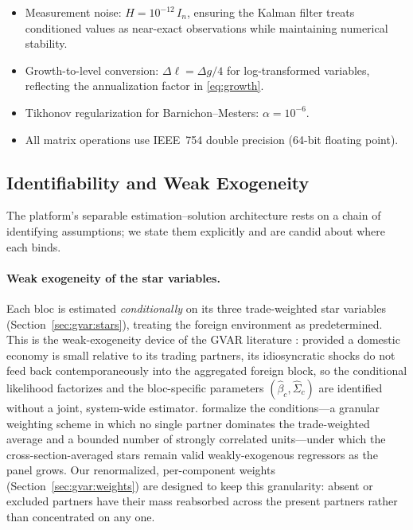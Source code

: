 \documentclass[11pt]{article}
\theoremstyle{definition}
\theoremstyle{remark}
\begin{document}
\begin{itemize}
  \item Measurement noise: $H = 10^{-12}\, I_n$, ensuring the Kalman
    filter treats conditioned values as near-exact observations while
    maintaining numerical stability.
  \item Growth-to-level conversion: $\Delta\ell = \Delta g / 4$ for
    log-transformed variables, reflecting the annualization factor in
    \eqref{eq:growth}.
  \item Tikhonov regularization for Barnichon--Mesters:
    $\alpha = 10^{-6}$.
  \item All matrix operations use IEEE~754 double precision
    (64-bit floating point).
\end{itemize}


\subsection{Identifiability and Weak Exogeneity}\label{sec:identif}

The platform's separable estimation--solution architecture rests on a chain of
identifying assumptions; we state them explicitly and are candid about where
each binds.

\paragraph{Weak exogeneity of the star variables.}
Each bloc is estimated \emph{conditionally} on its three trade-weighted star
variables (Section~\ref{sec:gvar:stars}), treating the foreign environment as
predetermined. This is the weak-exogeneity device of the GVAR literature
\citep{PesaranSchuermannWeiner2004, DeesDiMauroPesaranSmith2007}: provided a
domestic economy is small relative to its trading partners, its idiosyncratic
shocks do not feed back contemporaneously into the aggregated foreign block, so
the conditional likelihood factorizes and the bloc-specific parameters
$(\hat\beta_c,\hat\Sigma_c)$ are identified without a joint, system-wide
estimator. \citet{ChudikPesaran2016} formalize the conditions---a granular
weighting scheme in which no single partner dominates the trade-weighted average
and a bounded number of strongly correlated units---under which the
cross-section-averaged stars remain valid weakly-exogenous regressors as the
panel grows. Our renormalized, per-component weights
(Section~\ref{sec:gvar:weights}) are designed to keep this granularity:
absent or excluded partners have their mass reabsorbed across the present
partners rather than concentrated on any one.
\end{document}
